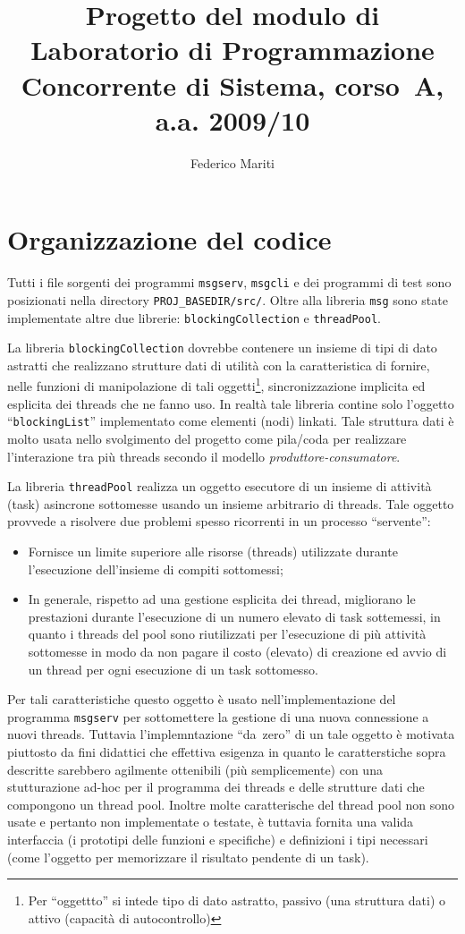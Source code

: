\documentclass[a4paper,10pt]{article}
\author{Federico Mariti}
\title{Progetto del modulo di Laboratorio di Programmazione
  Concorrente di Sistema, corso~A, a.a. 2009/10}
\date{}
\begin{document}
\maketitle
\renewcommand{\contentsname}{Indice}
\setcounter{tocdepth}{2}
\tableofcontents
\newpage
\section{Organizzazione del codice}
Tutti i file sorgenti dei programmi \texttt{msgserv}, \texttt{msgcli}
e dei programmi di test sono posizionati nella directory
\verb+PROJ_BASEDIR/src/+. Oltre alla libreria \texttt{msg} sono state
implementate altre due librerie: \texttt{blockingCollection} e
\texttt{threadPool}. 

La libreria \texttt{blockingCollection} dovrebbe contenere un insieme
di tipi di dato astratti che realizzano strutture dati di utilit\`a
con la caratteristica di fornire, nelle funzioni di manipolazione di
tali oggetti\footnote{Per ``oggettto'' si intede tipo di dato
  astratto, passivo (una struttura dati) o attivo (capacit\`a di
  autocontrollo)}, sincronizzazione implicita ed esplicita dei threads
che ne fanno uso. In realt\`a tale libreria contine solo l'oggetto
``\texttt{blockingList}'' implementato come elementi (nodi)
linkati. Tale struttura dati \`e molto usata nello svolgimento del
progetto come pila/coda per realizzare l'interazione tra pi\`u threads
secondo il modello \emph{produttore-consumatore}.

La libreria \texttt{threadPool} realizza un oggetto esecutore di un
insieme di attivit\`a (task) asincrone sottomesse usando un insieme
arbitrario di threads. Tale oggetto provvede a risolvere due problemi
spesso ricorrenti in un processo ``servente'':
\begin{itemize}
  \item Fornisce un limite superiore alle risorse (threads) utilizzate
    durante l'esec\-uzione dell'insieme di compiti sottomessi;
  \item In generale, rispetto ad una gestione esplicita dei thread,
    migliorano le prestazioni durante l'esecuzione di un numero
    elevato di task sottemessi, in quanto i threads del pool sono
    riutilizzati per l'esecuzione di pi\`u attivit\`a sottomesse in
    modo da non pagare il costo (elevato) di creazione ed avvio di un
    thread per ogni esecuzione di un task sottomesso.
\end{itemize}
Per tali caratteristiche questo oggetto \`e usato nell'implementazione
del programma \texttt{msgserv} per sottomettere la gestione di una
nuova connessione a nuovi threads. Tuttavia l'implemntazione
``da~zero'' di un tale oggetto \`e motivata piuttosto da fini
didattici che effettiva esigenza in quanto le caratterstiche sopra
descritte sarebbero agilmente ottenibili (pi\`u semplicemente) con una
stutturazione ad-hoc per il programma dei threads e delle strutture
dati che compongono un thread pool. Inoltre molte caratterische del
thread pool non sono usate e pertanto non implementate o testate, \`e
tuttavia fornita una valida interfaccia (i prototipi delle funzioni e
specifiche) e definizioni i tipi necessari (come l'oggetto per
memorizzare il risultato pendente di un task). 
\end{document}
